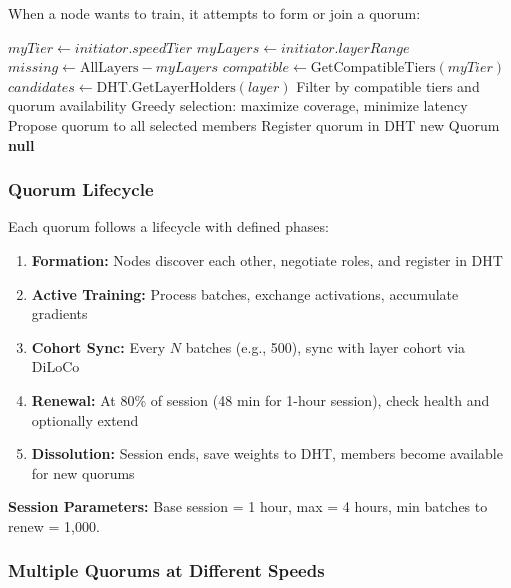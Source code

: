 \documentclass[11pt,a4paper]{article}
\begin{document}
When a node wants to train, it attempts to form or join a quorum:

\begin{algorithm}[H]
\caption{Quorum Formation}
\begin{algorithmic}[1]
    \State $myTier \gets initiator.speedTier$
    \State $myLayers \gets initiator.layerRange$
    \State $missing \gets \text{AllLayers} - myLayers$
    \State $compatible \gets \text{GetCompatibleTiers}(myTier)$
    \State
        \State $candidates \gets \text{DHT.GetLayerHolders}(layer)$
        \State Filter by compatible tiers and quorum availability
    \EndFor
    \State
    \State Greedy selection: maximize coverage, minimize latency
    \State
        \State Propose quorum to all selected members
            \State Register quorum in DHT
            \State \Return new Quorum
        \EndIf
    \EndIf
    \State \Return \textbf{null} 
\EndProcedure
\end{algorithmic}
\end{algorithm}

\subsubsection{Quorum Lifecycle}
Each quorum follows a lifecycle with defined phases:

\begin{enumerate}
    \item \textbf{Formation:} Nodes discover each other, negotiate roles, and register in DHT
    \item \textbf{Active Training:} Process batches, exchange activations, accumulate gradients
    \item \textbf{Cohort Sync:} Every $N$ batches (e.g., 500), sync with layer cohort via DiLoCo
    \item \textbf{Renewal:} At 80\% of session (48 min for 1-hour session), check health and optionally extend
    \item \textbf{Dissolution:} Session ends, save weights to DHT, members become available for new quorums
\end{enumerate}

\textbf{Session Parameters:} Base session = 1 hour, max = 4 hours, min batches to renew = 1,000.

\subsubsection{Multiple Quorums at Different Speeds}
\end{document}
